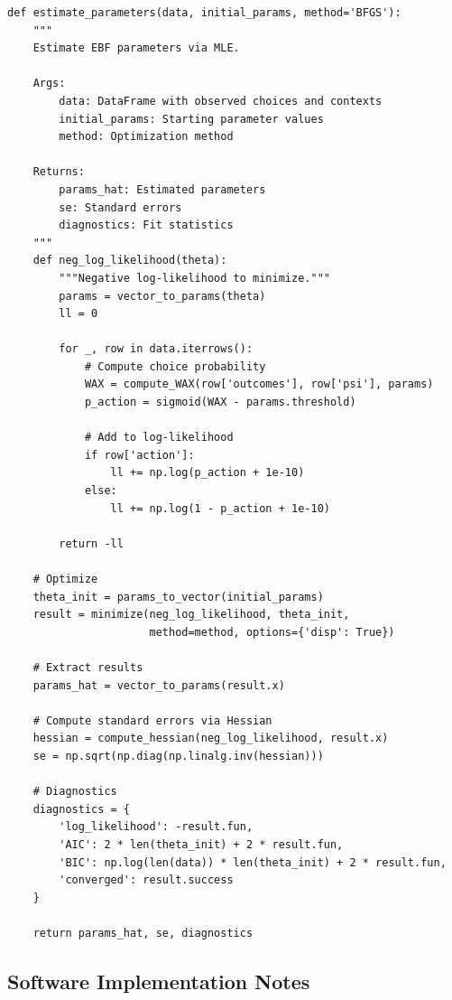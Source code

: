 \begin{tcolorbox}[colback=gray!5!white, colframe=gray!75!black,
    title=Implementation AZ-S5: Maximum Likelihood Estimation]
\begin{verbatim}
def estimate_parameters(data, initial_params, method='BFGS'):
    """
    Estimate EBF parameters via MLE.

    Args:
        data: DataFrame with observed choices and contexts
        initial_params: Starting parameter values
        method: Optimization method

    Returns:
        params_hat: Estimated parameters
        se: Standard errors
        diagnostics: Fit statistics
    """
    def neg_log_likelihood(theta):
        """Negative log-likelihood to minimize."""
        params = vector_to_params(theta)
        ll = 0

        for _, row in data.iterrows():
            # Compute choice probability
            WAX = compute_WAX(row['outcomes'], row['psi'], params)
            p_action = sigmoid(WAX - params.threshold)

            # Add to log-likelihood
            if row['action']:
                ll += np.log(p_action + 1e-10)
            else:
                ll += np.log(1 - p_action + 1e-10)

        return -ll

    # Optimize
    theta_init = params_to_vector(initial_params)
    result = minimize(neg_log_likelihood, theta_init,
                      method=method, options={'disp': True})

    # Extract results
    params_hat = vector_to_params(result.x)

    # Compute standard errors via Hessian
    hessian = compute_hessian(neg_log_likelihood, result.x)
    se = np.sqrt(np.diag(np.linalg.inv(hessian)))

    # Diagnostics
    diagnostics = {
        'log_likelihood': -result.fun,
        'AIC': 2 * len(theta_init) + 2 * result.fun,
        'BIC': np.log(len(data)) * len(theta_init) + 2 * result.fun,
        'converged': result.success
    }

    return params_hat, se, diagnostics
\end{verbatim}
\end{tcolorbox}

\subsection{Software Implementation Notes}

